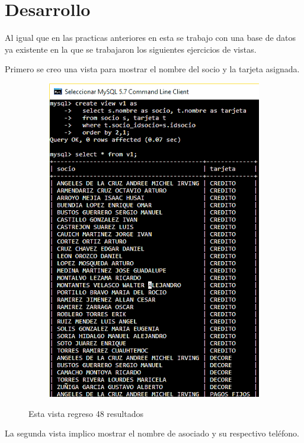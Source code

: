 \documentclass[12pt, titlepage]{article}
\begin{document}
	\section{Desarrollo}
	Al igual que en las practicas anteriores en esta se trabajo con una base de datos ya existente en la que se trabajaron los siguientes ejercicios de vistas.
	
	Primero se creo una vista para mostrar el nombre del socio y la tarjeta asignada.
	\begin{figure}[H]
		\begin{center}
			\includegraphics[width=12cm, height=14cm]{img/v1.png}
			\label{fig:v1}
			\caption{Esta vista regreso 48 resultados}
		\end{center}
	\end{figure}
\newpage
	La segunda vista implico mostrar el nombre de asociado y su respectivo teléfono.
\end{document}
